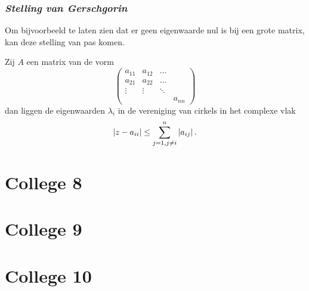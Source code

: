 \documentclass{2wn20summary}
\begin{document}
		   \subsubsection{\textit{Stelling van Gerschgorin}}
		   Om bijvoorbeeld te laten zien dat er geen eigenwaarde nul is bij een grote matrix, kan deze stelling van pas komen. 
		   \begin{theorem}
			   	Zij $A$ een matrix van de vorm
			   	\[ 
				   	\begin{pmatrix}
					   	a_{11} & a_{12} & \dots \\
					   	a_{21} & a_{22} & \dots \\
					   	\vdots & \vdots & \ddots \\
					   	 &  & & a_{nn}
				   	\end{pmatrix}
			   	 \]
			   	 dan liggen de eigenwaarden $\lambda_i$ in de vereniging van cirkels in het complexe vlak 
			   	 \[ 
				   	 {\left|z -a_{ii}\right|} \le \sum_{j=1, j\neq i}^n {\left|a_{ij}\right|} \,.
			   	  \]
		   \end{theorem}

	\section{College 8}
	
	\section{College 9}
	
	\section{College 10}


	\newpage
	\printindex
	
	
\end{document}

